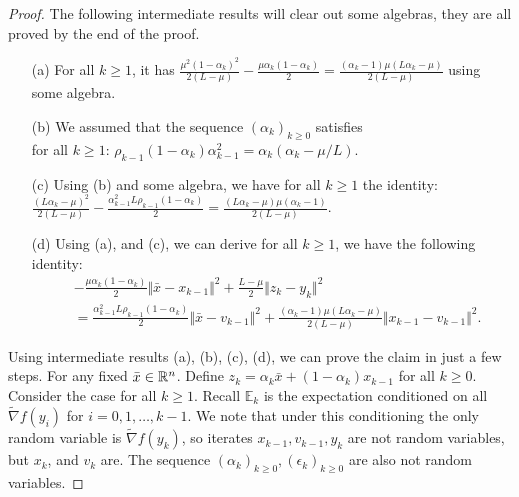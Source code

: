\documentclass[12pt]{article}
\newcommand{\expect}{\ensuremath{\mathbb E}}
\begin{document}
        \begin{proof}
            The following intermediate results will clear out some algebras, they are all proved by the end of the proof. 
            \begin{enumerate}
                \item [(a)] For all $k \ge 1$, it has $\frac{\mu^2(1 - \alpha_k)^2}{2(L - \mu)} - \frac{\mu\alpha_k(1 - \alpha_k)}{2} = \frac{(\alpha_k - 1)\mu\left(L\alpha_k - \mu\right)}{2\left(L - \mu\right)}$ using some algebra. 
                \item [(b)] We assumed that the sequence $(\alpha_k)_{k \ge 0}$ satisfies\\ for all $k \ge 1$: $\rho_{k - 1}(1 - \alpha_{k})\alpha_{k - 1}^2 = \alpha_{k}(\alpha_{k} - \mu/L)$. 
                \item [(c)] Using (b) and some algebra, we have for all $k \ge 1$ the identity: \\
                $\frac{(L\alpha_k - \mu)^2}{2(L - \mu)} - \frac{\alpha_{k - 1}^2 L \rho_{k - 1}(1 - \alpha_k)}{2} = \frac{(L\alpha_k - \mu)\mu(\alpha_k - 1)}{2(L - \mu)}$. 
                \item [(d)] Using (a), and (c), we can derive for all $k\ge 1$, we have the following identity: 
                \begin{align*}
                    & - \frac{\mu\alpha_k(1 - \alpha_k)}{2}\Vert \bar x - x_{k - 1}\Vert^2
                    + \frac{L - \mu}{2}\Vert z_k - y_k\Vert^2
                    \\ &= 
                    \frac{\alpha_{k - 1}^2L \rho_{k - 1}(1 - \alpha_k)}{2}\Vert \bar x - v_{k - 1}\Vert^2
                    + \frac{(\alpha_k - 1)\mu(L\alpha_k - \mu)}{2(L - \mu)}\Vert x_{k - 1} - v_{k - 1}\Vert^2. 
                \end{align*}
            \end{enumerate}
            Using intermediate results (a), (b), (c), (d), we can prove the claim in just a few steps. 
            For any fixed $\bar x \in \mathbb R^n$. 
            Define $z_k = \alpha_k \bar x + (1 - \alpha_k)x_{k - 1}$ for all $k \ge 0$. 
            Consider the case for all $k \ge 1$. 
            Recall $\expect_{k}$ is the expectation conditioned on all $\tilde \nabla f(y_i)$ for $i = 0, 1, \ldots, k - 1$. 
            We note that under this conditioning the only random variable is $\tilde \nabla f(y_k)$, so iterates $x_{k - 1}, v_{k - 1}, y_k$ are not random variables, but $x_k$, and $v_k$ are. 
            The sequence $(\alpha_k)_{k \ge 0}, (\epsilon_k)_{k \ge 0}$ are also not random variables. 

\end{proof}
\end{document}
